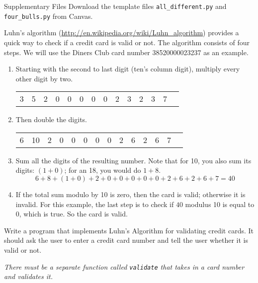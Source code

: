 \documentclass[11pt]{cselabheader}
\begin{document}
\begin{infobox}{Supplementary Files}
Download the template files \texttt{all\_different.py} and \texttt{four\_bulls.py}
from Canvas.
\end{infobox}

\begin{ex}[luhns.py] Luhn's algorithm
 (\url{http://en.wikipedia.org/wiki/Luhn_algorithm}) provides a quick way to
 check if a credit card is valid or not. The algorithm consists of four
 steps.
 We will use the Diners Club card number 38520000023237 as an example.

 \begin{enumerate}

\item Starting with the second to last digit (ten's column digit),
     multiply every other digit by two.

 \begin{center}
 \begin{tabular}{llllllllllllll}
3 & 5  & 2 & 0 & 0 & 0 & 0 & 0 & 2 & 3 & 2 & 3 & 7\\
 \end{tabular}
 \end{center}

\item Then double the digits.
 \begin{center}
 \begin{tabular}{llllllllllllll}
6 & 10 & 2 & 0 & 0 & 0 & 0 & 0 & 2 & 6 & 2 & 6 & 7
 \end{tabular}
 \end{center}

\item Sum all the digits of the resulting number.
 Note that for 10, you also sum its digits: $(1 + 0)$; for an 18, you would do $1 + 8$.
 \[ 6 + 8 + (1 + 0) + 2 + 0 + 0 + 0 + 0 + 0 + 2 + 6 + 2 + 6 + 7 = 40 \]

 \item If the total sum modulo by 10 is zero, then the card is valid;
     otherwise it is invalid.
 For this example, the last step is to check if $40$ modulus 10 is equal to 0, which is true.
 So the card is valid.
 \end{enumerate}

 Write a program that implements Luhn's Algorithm for validating credit
 cards. It should ask the user to enter a credit card number and tell the
 user whether it is valid or not.

 \emph{There must be a separate function called \texttt{validate}
that takes in a card number and
 validates it.}
\end{ex}
\end{document}
